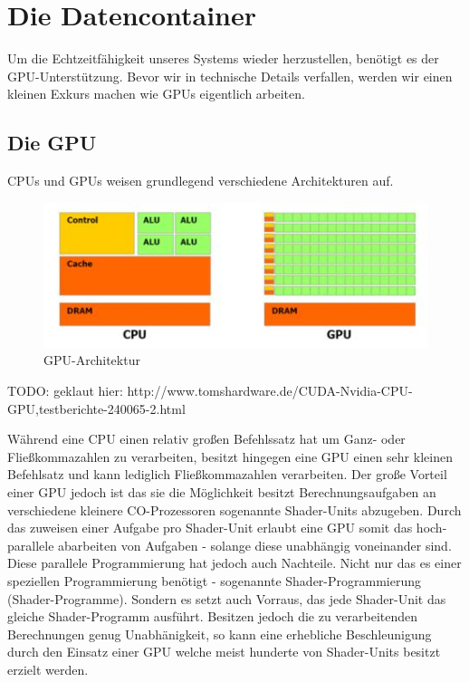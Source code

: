 \section{Die Datencontainer}
\begin{Spacing}{\mylinespace}

Um die Echtzeitfähigkeit unseres Systems wieder herzustellen, benötigt es der GPU-Unterstützung.
Bevor wir in technische Details verfallen, werden wir einen kleinen Exkurs machen wie GPUs eigentlich arbeiten.

\subsection{Die GPU}
CPUs und GPUs weisen grundlegend verschiedene Architekturen auf. 

\begin{figure}[h!]
	\vspace*{30px}
	\includegraphics[width=\columnwidth]{graphics/GPUvsCPU.jpg}	
	\caption{GPU-Architektur}
	\label{fig:GPUvsCPU}
\end{figure}
TODO: geklaut hier: http://www.tomshardware.de/CUDA-Nvidia-CPU-GPU,testberichte-240065-2.html

Während eine CPU einen relativ großen Befehlssatz hat um Ganz- oder Fließkommazahlen zu verarbeiten, besitzt hingegen eine GPU einen sehr kleinen Befehlsatz und kann lediglich Fließkommazahlen verarbeiten.
Der große Vorteil einer GPU jedoch ist das sie die Möglichkeit besitzt Berechnungsaufgaben an verschiedene kleinere CO-Prozessoren sogenannte Shader-Units abzugeben.
Durch das zuweisen einer Aufgabe pro Shader-Unit erlaubt eine GPU somit das hoch-parallele abarbeiten von Aufgaben - solange diese unabhängig voneinander sind.
Diese parallele Programmierung hat jedoch auch Nachteile.
Nicht nur das es einer speziellen Programmierung benötigt - sogenannte Shader-Programmierung (Shader-Programme).
Sondern es setzt auch Vorraus, das jede Shader-Unit das gleiche Shader-Programm ausführt.
Besitzen jedoch die zu verarbeitenden Berechnungen genug Unabhänigkeit, so kann eine erhebliche Beschleunigung durch den Einsatz einer GPU welche meist hunderte von Shader-Units besitzt erzielt werden.



\end{Spacing}
